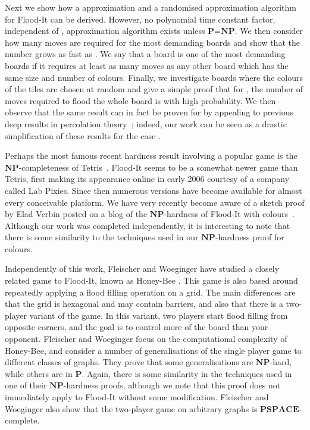 \documentclass[a4paper,11pt]{llncs}
\newcounter{l}
\newcommand{\Ptime}{\ensuremath{\mathbf{P}}}
\newcommand{\NPtime}{\ensuremath{\mathbf{NP}}}
\newcommand{\PSPACE}{\ensuremath{\mathbf{PSPACE}}}
\begin{document}
 Next we show how a  approximation and a randomised  approximation algorithm for Flood-It can be derived. However, no polynomial time constant factor, independent of , approximation algorithm exists unless \Ptime=\NPtime.  We then consider how many moves are required for the most demanding boards and show that the number grows as fast as . We say that a board is one of the most demanding boards if it requires at least as many moves as any other board which has the same size and number of colours. Finally, we investigate boards where the colours of the tiles are chosen at random and give a simple proof that for , the number of moves required to flood the whole board is  with high probability. We then observe that the same result can in fact be proven for  by appealing to previous deep results in percolation theory~\cite{CW1993:random,FN1993:random}; indeed, our work can be seen as a drastic simplification of these results for the case .





\vskip 3pt
 Perhaps the most famous recent hardness result involving a popular game is the \NPtime-completeness of Tetris~\cite{DHL2003:Tetris}. Flood-It seems to be a somewhat newer game than Tetris, first making its appearance online in early 2006 courtesy of a company called Lab Pixies.  Since then numerous versions have become available for almost every conceivable platform. We have very recently become aware of a sketch proof by Elad Verbin posted on a blog of the \NPtime-hardness of Flood-It with  colours~\cite{Verbinblog:2009}. Although our work was completed independently, it is interesting to note that there is some similarity to the techniques used in our \NPtime-hardness proof for  colours.

Independently of this work, Fleischer and Woeginger have studied a closely related game to Flood-It, known as Honey-Bee \cite{FW2010:honey}. This game is also based around repeatedly applying a flood filling operation on a grid. The main differences are that the grid is hexagonal and may contain barriers, and also that there is a two-player variant of the game. In this variant, two players start flood filling from opposite corners, and the goal is to control more of the board than your opponent. Fleischer and Woeginger focus on the computational complexity of Honey-Bee, and consider a number of generalisations of the single player game to different classes of graphs. They prove that some generalisations are \NPtime-hard, while others are in \Ptime. Again, there is some similarity in the techniques used in one of their \NPtime-hardness proofs, although we note that this proof does not immediately apply to Flood-It without some modification. Fleischer and Woeginger also show that the two-player game on arbitrary graphs is \PSPACE-complete.
\end{document}
